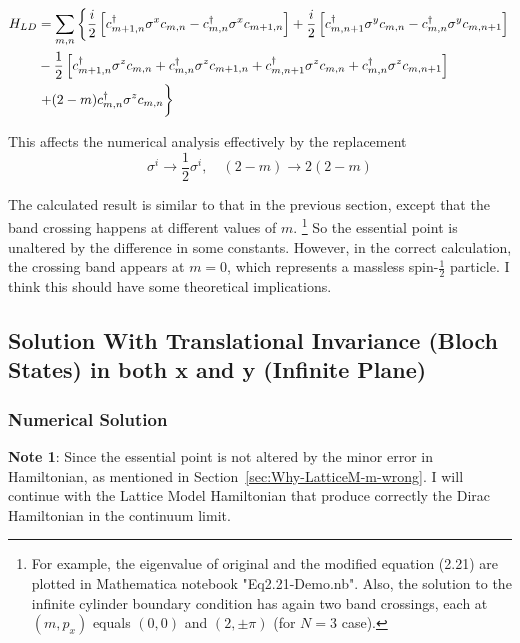 \documentclass{article}
\begin{document}
\begin{align}
    H_{LD} &= \sum_{m,n}\left\{
        \frac{i}{2} \left[ c^\dagger_{m+1,n}\sigma^x c_{m,n}
            - c^\dagger_{m,n}\sigma^x c_{m+1,n}\right]
        + \frac{i}{2} \left[ c^\dagger_{m,n+1}\sigma^y c_{m,n}
            - c^\dagger_{m,n}\sigma^y c_{m,n+1} \right]
        \right.
        \nonumber\\
        &- \frac{1}{2}\left[
            c^\dagger_{m+1,n}\sigma^z c_{m,n}
            + c^\dagger_{m,n}\sigma^z c_{m+1,n}
            + c^\dagger_{m,n+1}\sigma^z c_{m,n}
            + c^\dagger_{m,n}\sigma^z c_{m,n+1}
        \right]
        \nonumber\\
        & \left. + (2-m) c^\dagger_{m,n}\sigma^z c_{m,n}
        \vphantom{\frac12}
    \right\}
\end{align}

This affects the numerical analysis effectively by the replacement
$$\sigma^i \to \frac{1}{2}\sigma^i,\quad
    (2-m) \to 2(2-m) $$

The calculated result is similar to that in the previous section,
except that the band crossing happens at different values of $m$.
\footnote{For example, the eigenvalue of original and the modified equation
(2.21) are plotted in Mathematica notebook "Eq2.21-Demo.nb". Also,
the solution to the infinite cylinder boundary condition has again
two band crossings, each at $(m,p_x)$ equals $(0,0)$ and
$(2,\pm\pi)$ (for $N=3$ case).}
So the essential point is unaltered by the difference in some
constants. However, in the correct calculation, the crossing band
appears at $m=0$, which represents a massless spin-$\frac{1}{2}$
particle. I think this should have some theoretical implications.

\subsection{Solution With Translational Invariance (Bloch States) in
both x and y (Infinite Plane)}

    \subsubsection{Numerical Solution}
    \label{sec:Numerical Solution}


    \textbf{Note 1}: Since the essential point is not altered by the minor
    error in Hamiltonian, as mentioned in
    Section~\ref{sec:Why-LatticeM-m-wrong}. I will continue with the
    Lattice Model Hamiltonian that produce correctly the Dirac Hamiltonian
    in the continuum limit.
\end{document}
